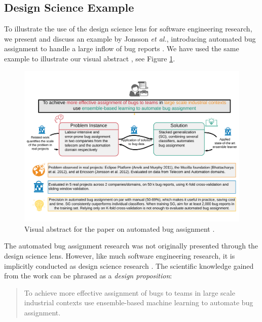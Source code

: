 \documentclass[graybox]{svmult}
\begin{document}
\subsection{Design Science Example}
\label{sec:examples}
To illustrate the use of the design science lens for software engineering research, we present and discuss an example by Jonsson \emph{et al.}, introducing automated bug assignment to handle a large inflow of bug reports \cite{JonssonBug15}. We have used the same example to illustrate our visual abstract \cite{StoreyESEM17}, see Figure \ref{fig:BugAssignment}.

\begin{figure}[t]
\begin{center}
\includegraphics[width=\columnwidth, trim={5mm 20mm 5mm 20mm },clip]{Figures/VATemplateJonsson.pdf}
\caption{Visual abstract for the paper on automated bug assignment \cite{JonssonBug15}.}
\label{fig:BugAssignment}
\end{center}
\end{figure}

The automated bug assignment research was not originally presented through the design science lens. However, like much software engineering research, it is implicitly conducted as design science research \cite{Engstrom19arxiv}. 
The scientific knowledge gained from the work can be phrased as a \emph{design proposition}:
\begin{quote}{To achieve more effective assignment of bugs to teams in large scale industrial contexts use ensemble-based machine learning to automate bug assignment. \cite{StoreyESEM17}}\end{quote}
\end{document}
